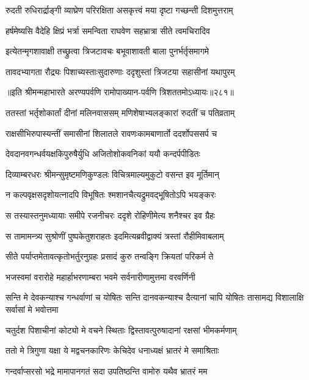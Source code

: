 \twolineshloka
{रुदती रुधिरार्द्राङ्गी व्याघ्रेण परिरक्षिता}
{असकृत्त्वं मया दृष्टा गच्छन्ती दिशमुत्तराम्}


\twolineshloka
{हर्षमेष्यसि वैदेहि क्षिप्रं भर्त्रा समन्विता}
{राघवेण सहभ्रात्रा सीते त्वमचिरादिव}


\twolineshloka
{इत्येतन्मृगशावाक्षी तच्छ्रुत्वा त्रिजटावचः}
{बभूवाशावती बाला पुनर्भर्तृसमागमे}


\twolineshloka
{तावदभ्यागता रौद्र्यः पिशाच्यस्ताःसुदारुणाः}
{ददृशुस्तां त्रिजटया सहासीनां यथापुरम्}


॥इति श्रीमन्महाभारते अरण्यपर्वणि रामोपाख्यान-पर्वणि त्रिशततमोऽध्यायः॥२८१॥




\twolineshloka
{ततस्तां भर्तृशोकार्तां दीनां मलिनवाससम्}
{मणिशेषाभ्यलङ्कारां रुदतीं च पतिव्रताम्}


\twolineshloka
{राक्षसीभिरुपास्यन्तीं समासीनां शिलातले}
{रावणःकामबाणार्तो ददर्शोपससर्प च}


\twolineshloka
{देवदानवगन्धर्वयक्षकिपुरुषैर्युधि}
{अजितोशोकवनिकां ययौ कन्दर्पपीडितः}


\twolineshloka
{दिव्याम्बरधरः श्रीमन्सुमृष्टमणिकुण्डलः}
{विचित्रमाल्यमुकुटो वसन्त इव मूर्तिमान्}


\twolineshloka
{न कल्पवृक्षसदृशोयत्नादपि विभूषितः}
{श्मशानचैत्यद्रुमवद्भूषितोऽपि भयङ्करः}


\twolineshloka
{स तस्यास्तनुमध्यायाः समीपे रजनीचरः}
{ददृशे रोहिणीमेत्य शनैश्चर इव ग्रैहः}


\twolineshloka
{स तामामन्त्र्य सुश्रोणीं पुष्पकेतुशराहतः}
{इदमित्यब्रवीद्वाक्यं त्रस्तां रौहीमिवाबलाम्}


\twolineshloka
{सीते पर्याप्तमेतावत्कृतोभर्तुरनुग्रहः}
{प्रसादं कुरु तन्वङ्गि क्रियतां परिकर्म ते}


\twolineshloka
{भजस्वमां वरारोहे महार्हाभरणाम्बरा}
{भवमे सर्वनारीणामुत्तमा वरवर्णिनी}


\threelineshloka
{सन्ति मे देवकन्याश्च गन्धर्वाणां च योषितः}
{सन्ति दानवकन्याश्च दैत्यानां चापि योषितः}
{तासामद्य विशालाक्षि सर्वासां मे भवोत्तमा}


\twolineshloka
{चतुर्दश पिशाचीनां कोट्यो मे वचने स्थिताः}
{द्विस्तावत्पुरुषादानां रक्षसां भीमकर्मणाम्}


\twolineshloka
{ततो मे त्रिगुणा यक्षा ये मद्वचनकारिणः}
{केचिदेव धनाध्यक्षं भ्रातरं मे समाश्रिताः}


\twolineshloka
{गन्दर्वाप्सरसो भद्रे मामापानगतं सदा}
{उपतिष्ठन्ति वामोरु यथैव भ्रातरं मम}


